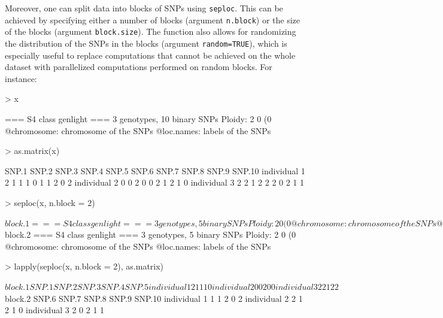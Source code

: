 \documentclass{article}
\begin{document}
Moreover, one can split data into blocks of SNPs using \texttt{seploc}.
This can be achieved by specifying either a number of blocks (argument \texttt{n.block}) or the size
of the blocks (argument \texttt{block.size}). The function also allows for randomizing the
distribution of the SNPs in the blocks (argument \texttt{random=TRUE}), which is especially useful
to replace computations that cannot be achieved on the whole dataset with parallelized computations performed on random blocks.
For instance:
\begin{Schunk}
\begin{Sinput}
> x
\end{Sinput}
\begin{Soutput}
 === S4 class genlight ===
 3 genotypes,  10 binary SNPs
 Ploidy: 2
 0 (0 %
 @chromosome: chromosome of the SNPs
 @loc.names: labels of the SNPs
\end{Soutput}
\begin{Sinput}
> as.matrix(x)
\end{Sinput}
\begin{Soutput}
             SNP.1 SNP.2 SNP.3 SNP.4 SNP.5 SNP.6 SNP.7 SNP.8 SNP.9 SNP.10
individual 1     2     1     1     1     0     1     1     2     0      2
individual 2     0     0     2     0     0     2     1     2     1      0
individual 3     2     2     1     2     2     2     0     2     1      1
\end{Soutput}
\begin{Sinput}
> seploc(x, n.block = 2)
\end{Sinput}
\begin{Soutput}
$block.1
 === S4 class genlight ===
 3 genotypes,  5 binary SNPs
 Ploidy: 2
 0 (0 %
 @chromosome: chromosome of the SNPs
 @loc.names: labels of the SNPs

$block.2
 === S4 class genlight ===
 3 genotypes,  5 binary SNPs
 Ploidy: 2
 0 (0 %
 @chromosome: chromosome of the SNPs
 @loc.names: labels of the SNPs
\end{Soutput}
\begin{Sinput}
> lapply(seploc(x, n.block = 2), as.matrix)
\end{Sinput}
\begin{Soutput}
$block.1
             SNP.1 SNP.2 SNP.3 SNP.4 SNP.5
individual 1     2     1     1     1     0
individual 2     0     0     2     0     0
individual 3     2     2     1     2     2

$block.2
             SNP.6 SNP.7 SNP.8 SNP.9 SNP.10
individual 1     1     1     2     0      2
individual 2     2     1     2     1      0
individual 3     2     0     2     1      1
\end{Soutput}
\end{Schunk}
\end{document}

